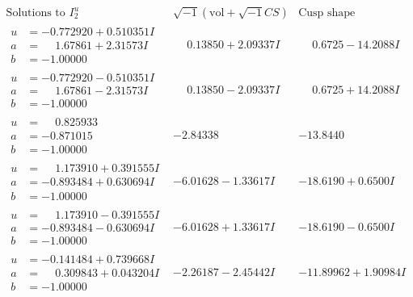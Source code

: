 \documentclass[1p]{elsarticle_modified}
\theoremstyle{definition}
\newcommand{\I}{\sqrt{-1}}
\begin{document}
$$\begin{array}{c|c|c}  
\text{Solutions to }I^u_{2}& \I (\text{vol} + \sqrt{-1}CS) & \text{Cusp shape}\\
 \hline 
\begin{aligned}
u &= -0.772920 + 0.510351 I \\
a &= \phantom{-}1.67861 + 2.31573 I \\
b &= -1.00000\phantom{ +0.000000I}\end{aligned}
 & \phantom{-}0.13850 + 2.09337 I & \phantom{-}0.6725 - 14.2088 I \\ \hline\begin{aligned}
u &= -0.772920 - 0.510351 I \\
a &= \phantom{-}1.67861 - 2.31573 I \\
b &= -1.00000\phantom{ +0.000000I}\end{aligned}
 & \phantom{-}0.13850 - 2.09337 I & \phantom{-}0.6725 + 14.2088 I \\ \hline\begin{aligned}
u &= \phantom{-}0.825933\phantom{ +0.000000I} \\
a &= -0.871015\phantom{ +0.000000I} \\
b &= -1.00000\phantom{ +0.000000I}\end{aligned}
 & -2.84338\phantom{ +0.000000I} & -13.8440\phantom{ +0.000000I} \\ \hline\begin{aligned}
u &= \phantom{-}1.173910 + 0.391555 I \\
a &= -0.893484 + 0.630694 I \\
b &= -1.00000\phantom{ +0.000000I}\end{aligned}
 & -6.01628 - 1.33617 I & -18.6190 + 0.6500 I \\ \hline\begin{aligned}
u &= \phantom{-}1.173910 - 0.391555 I \\
a &= -0.893484 - 0.630694 I \\
b &= -1.00000\phantom{ +0.000000I}\end{aligned}
 & -6.01628 + 1.33617 I & -18.6190 - 0.6500 I \\ \hline\begin{aligned}
u &= -0.141484 + 0.739668 I \\
a &= \phantom{-}0.309843 + 0.043204 I \\
b &= -1.00000\phantom{ +0.000000I}\end{aligned}
 & -2.26187 - 2.45442 I & -11.89962 + 1.90984 I \\ \hline\begin{aligned}

\end{aligned}
\end{array}$$
\end{document}
